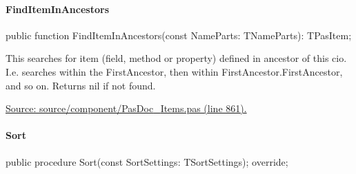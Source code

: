 \documentclass{report}
\newif\ifpdf
\begin{document}
\paragraph*{FindItemInAncestors}\hspace*{\fill}

\label{PasDoc_Items.TPasCio-FindItemInAncestors}
\begin{list}{}{
\setlength{\itemindent}{0cm}
\setlength{\listparindent}{0cm}
\setlength{\leftmargin}{\evensidemargin}
\addtolength{\leftmargin}{\tmplength}
\settowidth{\labelsep}{X}
\addtolength{\leftmargin}{\labelsep}
\setlength{\labelwidth}{\tmplength}
}
\item[\textbf{Declaration}\hfill]
\ifpdf
\begin{flushleft}
\fi
\begin{ttfamily}
public function FindItemInAncestors(const NameParts: TNameParts): TPasItem;\end{ttfamily}

\ifpdf
\end{flushleft}
\fi

\par
\item[\textbf{Description}]
This searches for item (field, method or property) defined in ancestor of this cio. I.e. searches within the FirstAncestor, then within FirstAncestor.FirstAncestor, and so on. Returns nil if not found.\par
\href{https://github.com/pasdoc/pasdoc/blob/master/source/component/PasDoc_Items.pas#L861}{Source: source/component/PasDoc{\_}Items.pas (line 861).}

\end{list}
\paragraph*{Sort}\hspace*{\fill}

\label{PasDoc_Items.TPasCio-Sort}
\begin{list}{}{
\setlength{\itemindent}{0cm}
\setlength{\listparindent}{0cm}
\setlength{\leftmargin}{\evensidemargin}
\addtolength{\leftmargin}{\tmplength}
\settowidth{\labelsep}{X}
\addtolength{\leftmargin}{\labelsep}
\setlength{\labelwidth}{\tmplength}
}
\item[\textbf{Declaration}\hfill]
\ifpdf
\begin{flushleft}
\fi
\begin{ttfamily}
public procedure Sort(const SortSettings: TSortSettings); override;\end{ttfamily}

\ifpdf
\end{flushleft}
\fi

\end{list}
\end{document}
